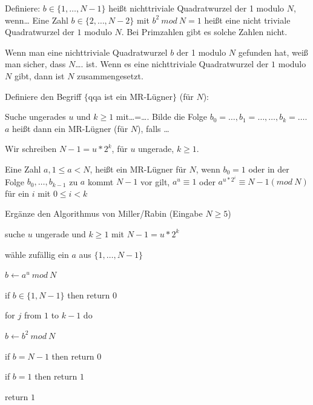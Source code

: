 \documentclass[avery5371, frame]{flashcards}
\begin{document}
\begin{flashcard}[Primzahlen]{Definiere: $b\in\{1,\dots,N-1\}$ heißt nichttriviale Quadratwurzel der 1 modulo $N$, wenn\dots}
    Eine Zahl $b\in\{2,\dots,N-2\}$ mit $b^2\ mod\ N=1$ heißt eine nicht triviale Quadratwurzel der $1$ modulo $N$. Bei Primzahlen gibt es solche Zahlen nicht.
\end{flashcard}

\begin{flashcard}[Primzahlen]{Wenn man eine nichttriviale Quadratwurzel $b$ der 1 modulo $N$ gefunden hat, weiß man sicher, dass $N$\dots. ist.}
    Wenn es eine nichttriviale Quadratwurzel der $1$ modulo $N$ gibt, dann ist $N$ zusammengesetzt.
\end{flashcard}

\begin{flashcard}[Primzahlen]{Definiere den Begriff $\{$qqa ist ein MR-Lügner$\}$ (für $N$):

        Suche ungerades $u$ und $k\geq 1$ mit\dots=\dots .
        Bilde die Folge $b_0=\dots,b_1=\dots,\dots,b_k=\dots$.
        $a$ heißt dann ein MR-Lügner (für $N$), falls \dots}

    Wir schreiben $N-1=u*2^k$, für $u$ ungerade, $k\geq 1$.

    Eine Zahl $a, 1\leq a < N$, heißt ein MR-Lügner für $N$, wenn $b_0=1$ oder in der Folge $b_0,\dots,b_{k-1}$ zu $a$ kommt $N-1$ vor gilt, $a^u\equiv 1$ oder $a^{u*2^i}\equiv N-1 (mod\ N)$ für ein $i$ mit $0\leq i < k$
\end{flashcard}

\begin{flashcard}[Primzahlen]{Ergänze den Algorithmus von Miller/Rabin (Eingabe $N\geq 5$)}
    \begin{itemize*}
        \item[] suche $u$ ungerade und $k\geq 1$ mit $N-1 =u*2^k$
        \item[] wähle zufällig ein $a$ aus $\{1 ,\dots,N-1\}$
        \item[] $b \leftarrow a^u\ mod\ N$ %
        \item[] if $b\in\{1,N-1\}$ then return $0$
        \item[] for $j$ from $1$ to $k-1$ do %
        \begin{itemize*}
            \item[] $b\leftarrow b^2\ mod\ N$
        \end{itemize*}
        \item[] if $b=N-1$ then return $0$
        \item[] if $b=1$ then return $1$
        \item[] return $1$
    \end{itemize*}
\end{flashcard}
\end{document}
